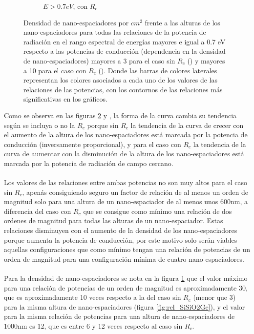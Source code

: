 \begin{figure}[H]
\begin{subfigure}[b]{0.49\textwidth}
			\caption{$E>0.7eV$, con $R_c$}
			\label{fig:rel_SiSiO2Ge_Rc}
		\end{subfigure}
	\caption{Densidad de nano-espaciadores por $cm^2$ frente a las alturas de los nano-espaciadores para todas las relaciones de la potencia de radiación en el rango espectral de energías mayores e igual a 0.7 eV respecto a las potencias de conducción (dependencia en la densidad de nano-espaciadores) mayores a 3 para el caso sin $R_c$ () y mayores a 10 para el caso con $R_c$ (). Donde las barras de colores laterales representan los colores asociados a cada uno de los valores de las relaciones de las potencias, con los contornos de las relaciones más significativas en los gráficos.}
	\label{fig:relation_SiSiO2Ge}
\end{figure}
Como se observa en las figuras \ref{fig:relation_SiSiO2Ge}  y , la forma de la curva cambia su tendencia según se incluya o no la $R_c$ porque sin $R_c$ la tendencia de la curva de crecer con el aumento de la altura de los nano-espaciadores está marcada por la potencia de conducción (inversamente proporcional), y para el caso con $R_c$ la  tendencia de la curva de aumentar con la disminución de la altura de los nano-espaciadores está marcada por la potencia de radiación de campo cercano.\\\\
Los valores de las relaciones entre ambas potencias no son muy altos para el caso sin $R_c$, apenás consiguiendo seguro un factor de relación de al menos un orden de magnitud solo para una altura de un nano-espaciador de al menos unos 600nm, a diferencia del caso con $R_c$ que se consigue como mínimo una relación de dos ordenes de magnitud para todas las alturas de un nano-espaciador. Estas relaciones disminuyen con el aumento de la densidad de los nano-espaciadores porque aumenta la potencia de conducción, por este motivo solo serán viables aquellas configuraciones que como mínimo tengan una relación de potencias de un orden de magnitud para una configuración mínima de cuatro nano-espaciadores.\\\\
Para la densidad de nano-espaciadores se nota en la figura \ref{fig:rel_SiSiO2Ge_Rc} que el valor máximo para una relación de potencias de un orden de magnitud es aproximadamente 30, que es aproximadamente 10 veces respecto a la del caso sin $R_c$ (menor que 3) para la misma altura de nano-espaciadores (figura \ref{fig:rel_SiSiO2Ge}), y el valor para la misma relación de potencias para una altura de nano-espaciadores de 1000nm es 12, que es entre 6 y 12 veces respecto al caso sin $R_c$.\\\\

